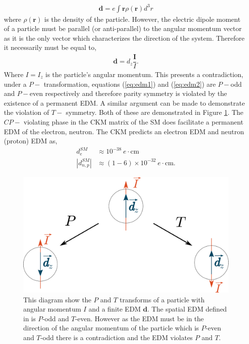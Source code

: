 \documentclass[10pt,a4paper, twoside]{report}
\begin{document}
\begin{align} \label{eq:edm1}
\textbf{d} = e\int \textbf{r}\rho(\textbf{r})d^3r
\end{align}
where $\rho(\textbf{r})$ is the density of the particle. However, the electric dipole moment of a particle must be parallel (or anti-parallel) to the angular momentum vector as it is the only vector which characterizes the direction of the system. Therefore it necessarily must be equal to, 
\begin{align} \label{eq:edm2}
\textbf{d}  = d_z \dfrac{\textbf{I}}{I}.
\end{align}
Where $I = I_z$ is the particle's angular momentum. This presents a contradiction, under a  $P-$  transformation, equations (\ref{eq:edm1}) and (\ref{eq:edm2}) are $P-$odd and $P-$even respectively and therefore parity symmetry is violated by the existence of a permanent EDM. A similar argument can be made to demonstrate the violation of $T-$ symmetry. Both of these are demonstrated in Figure \ref{fig:ParityTimeEDM}. The $CP-$ violating phase in the CKM matrix of the SM does facilitate a permanent EDM of the electron, neutron. The CKM predicts an electron EDM\cite{Ng1996} and neutron (proton) EDM \cite{Seng2015} as,
\begin{align}
d_{e}^{SM} &\approx 10^{-38} \ e\cdot\text{cm} \\
|d_{n,p}^{SM}| &\approx (1-6) \times 10^{-32} \ e\cdot\text{cm}.
\end{align} 
\begin{figure}
\includegraphics[scale=0.3]{./figures/EDM.eps}
\caption[Parity and time reversal transforms of a permanent EDM]{\label{fig:ParityTimeEDM} This diagram show the $P$ and $T$ transforms of a particle with angular momentum $I$ and a finite EDM $\textbf{d}$. The spatial EDM defined in  is $P$-odd and $T$-even. However as the EDM must be in the direction of the angular momentum of the particle which is $P$-even and $T$-odd there is a contradiction and the EDM violates $P$ and $T$.}
\end{figure}
\end{document}
